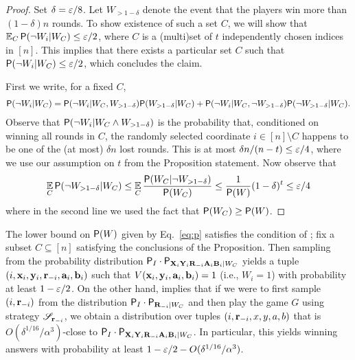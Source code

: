 \begin{proof}
	Set $\delta = \eps/8$. Let $W_{> 1 - \delta}$ denote the event that the players win more than $(1 - \delta)n$ rounds. To show existence of such a set $C$, we will show that $\Ex_C \P(\neg W_i | W_C) \leq \eps/2$, where $C$ is a (multi)set of $t$ independently chosen indices in $[n]$. This implies that there exists a particular set $C$ such that $\P(\neg W_i | W_C) \leq \eps/2$, which concludes the claim.
	
	First we write, for a fixed $C$,
	\begin{align*}
		\P ( \neg W_i | W_C) = \P(\neg W_i | W_C, W_{> 1 - \delta}) \P(W_{> 1 - \delta} | W_C) + \P(\neg W_i | W_C, \neg W_{> 1 - \delta}) \P(\neg W_{> 1 - \delta} | W_C).
	\end{align*}
	Observe that $\P(\neg W_i | W_C \wedge W_{> 1 - \delta})$ is the probability that, conditioned on winning all rounds in $C$, the randomly selected coordinate $i \in [n] \setminus C$ happens to be one of the (at most) $\delta n$ lost rounds. This is at most $\delta n/(n - t) \leq \eps/4$, where we use our assumption on $t$ from the Proposition statement. Now observe that 
	\begin{align*}
		\Ex_C \P(\neg W_{> 1 - \delta} | W_C) \leq \Ex_C \frac{\P(W_C | \neg W_{> 1 - \delta})}{\P(W_C)} \leq \frac{1}{\P(W)} (1 - \delta)^t \leq \eps/4
	\end{align*}
	where in the second line we used the fact that $\P(W_C) \geq \P(W)$.	
\end{proof}

The lower bound on $\P(W)$ given by Eq.~\eqref{eq:p} satisfies the condition of ; fix a subset $C \subseteq [n]$ satisfying the conclusions of the Proposition. Then sampling from the probability distribution $\P_I \cdot \P_{\bX_i \bY_i \bR_\mi \bA_i \bB_i | W_C}$ yields a tuple $(i,\bx_i,\by_i,\br_\mi,\ba_i,\bb_i)$ such that $V(\bx_i,\by_i,\ba_i,\bb_i) = 1$ (i.e., $W_i = 1$) with probability at least $1 - \eps/2$. On the other hand,  implies that if we were to first sample $(i,\br_\mi)$ from the distribution $\P_I \cdot \P_{\bR_\mi | W_C}$ and then play the game $G$ using strategy $\strategy_{\br_\mi}$, we obtain a distribution over tuples $(i,\br_\mi,x,y,a,b)$ that is $O(\delta^{1/16}/\alpha^3)$-close to $\P_I \cdot \P_{\bX_i \bY_i \bR_\mi \bA_i \bB_i | W_C}$. In particular, this yields winning answers with probability at least $1 - \eps/2 - O(\delta^{1/16}/\alpha^3)$. 

